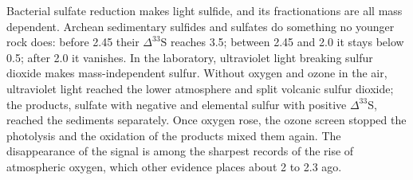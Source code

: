 Bacterial sulfate reduction makes light sulfide, and its fractionations are
all mass dependent. Archean sedimentary sulfides and sulfates do something no
younger rock does: before \qty{2.45}{\Ga} their $\Delta^{33}\mathrm S$ reaches
\qty{3.5}{\permil}; between 2.45 and \qty{2.0}{\Ga} it stays below
\qty{0.5}{\permil}; after \qty{2.0}{\Ga} it vanishes. In the laboratory,
ultraviolet light breaking sulfur dioxide makes mass-independent sulfur.
Without oxygen and ozone in the air, ultraviolet light reached the lower
atmosphere and split volcanic sulfur dioxide; the products, sulfate with
negative and elemental sulfur with positive $\Delta^{33}\mathrm S$, reached the
sediments separately. Once oxygen rose, the ozone screen stopped the
photolysis and the oxidation of the products mixed them again. The
disappearance of the signal is among the sharpest records of the rise of
atmospheric oxygen, which other evidence places about 2 to \qty{2.3}{\Ga}
ago.

\begin{omfigure}

\par{}\label{fig:b3:stable-isotopes:three-isotope}
\end{omfigure}

